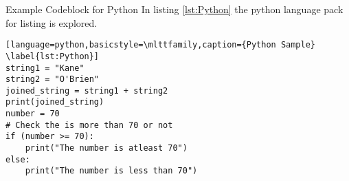 \begin{codeblock}{Example Codeblock for Python}
In listing \ref{lst:Python} the python language pack for listing is explored.

\begin{lstlisting}[language=python,basicstyle=\mlttfamily,caption={Python Sample} \label{lst:Python}]
string1 = "Kane"
string2 = "O'Brien"
joined_string = string1 + string2
print(joined_string)
number = 70
# Check the is more than 70 or not
if (number >= 70):
    print("The number is atleast 70")
else:
    print("The number is less than 70")
\end{lstlisting}
\end{codeblock}
\clearpage
